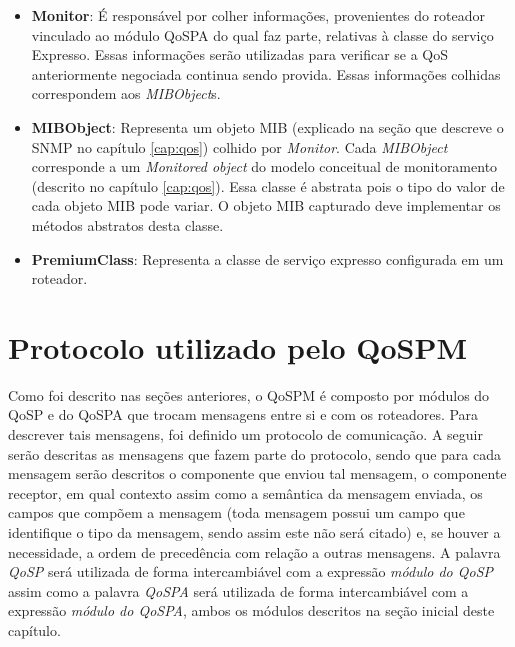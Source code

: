 \begin{itemize}
\item \textbf{Monitor}: É responsável por colher informações, provenientes do roteador vinculado ao módulo QoSPA do qual faz parte, relativas à classe do serviço Expresso. Essas informações serão utilizadas para verificar se a QoS anteriormente negociada continua sendo provida. Essas informações colhidas correspondem aos \textit{MIBObject}s.

\item \textbf{MIBObject}: Representa um objeto MIB (explicado na seção que descreve o SNMP no capítulo \ref{cap:qos}) colhido por \textit{Monitor}. Cada \textit{MIBObject} corresponde a um \textit{Monitored object} do modelo conceitual de monitoramento (descrito no capítulo \ref{cap:qos}). Essa classe é abstrata pois o tipo do valor de cada objeto MIB pode variar. O objeto MIB capturado deve implementar os métodos abstratos desta classe.

\item \textbf{PremiumClass}: Representa a classe de serviço expresso configurada em um roteador.
\end{itemize}

\section{Protocolo utilizado pelo QoSPM}
	Como foi descrito nas seções anteriores, o QoSPM é composto por módulos do QoSP e do QoSPA que trocam mensagens entre si e com os roteadores. Para descrever tais mensagens, foi definido um protocolo de comunicação. A seguir serão descritas as mensagens que fazem parte do protocolo, sendo que para cada mensagem serão descritos o componente que enviou tal mensagem, o componente receptor, em qual contexto assim como a semântica da mensagem enviada, os campos que compõem a mensagem (toda mensagem possui um campo que identifique o tipo da mensagem, sendo assim este não será citado) e, se houver a necessidade, a ordem de precedência com relação a outras mensagens. A palavra \textit{QoSP} será utilizada de forma intercambiável com a expressão \textit{módulo do QoSP} assim como a palavra \textit{QoSPA} será utilizada de forma intercambiável com a expressão \textit{módulo do QoSPA}, ambos os módulos descritos na seção inicial deste capítulo.
	
